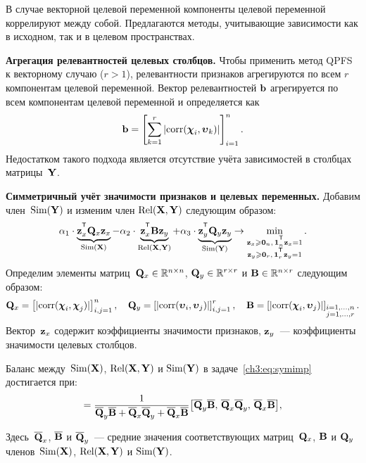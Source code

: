 \documentclass[11pt, a5paper]{dissert}
\begin{document}
В случае векторной целевой переменной компоненты целевой переменной коррелируют между собой. 
Предлагаются методы, учитывающие зависимости как в исходном, так и в целевом пространствах.

\textbf{Агрегация релевантностей целевых столбцов.}
Чтобы применить метод QPFS к векторному случаю ($r > 1$), релевантности признаков агрегируются по всем $r$ компонентам целевой переменной. 
Вектор релевантностей $\mathbf{b}$ агрегируется по всем компонентам целевой переменной и определяется как
\begin{equation*}
	\mathbf{b} = \left[\sum_{k=1}^r|\text{corr}(\boldsymbol{\chi}_i, \boldsymbol{\upsilon}_k)|\right]_{i=1}^n.
\end{equation*}
Недостатком такого подхода является отсутствие учёта зависимостей в столбцах матрицы~$\mathbf{Y}$. 

\textbf{Симметричный учёт значимости признаков и целевых переменных.}
Добавим член~$\text{Sim}(\mathbf{Y})$ и изменим член $\text{Rel}(\mathbf{X}, \mathbf{Y})$ следующим образом:
\begin{equation}
	\alpha_1 \cdot \underbrace{\bz_x^{\T} \bQ_x \bz_x}_{\text{Sim}(\bX)} - \alpha_2 \cdot \underbrace{\bz_x^{\T} \bB \bz_y}_{\text{Rel}(\bX, \bY)} + \alpha_3 \cdot \underbrace{\bz_y^{\T} \bQ_y \bz_y}_{\text{Sim}(\bY)} \rightarrow \min_{\substack{\bz_x \geq \bZero_n, \, \bOne_n^{\T}\bz_x=1 \\ \bz_y \geq \bZero_r, \, \bOne_r^{\T}\bz_y=1}}.
	\label{ch3:eq:symimp}
\end{equation}
Определим элементы матриц~$\mathbf{Q}_x \in \mathbb{R}^{n \times n}$, $\mathbf{Q}_y \in \mathbb{R}^{r \times r}$ и $\mathbf{B} \in \mathbb{R}^{n \times r}$ следующим образом:
\begin{equation*}
	\mathbf{Q}_x = \left[ |\text{corr}(\boldsymbol{\chi}_i, \boldsymbol{\chi}_j)| \right]_{i,j=1}^n, \quad
	\mathbf{Q}_y = \left[ |\text{corr}(\boldsymbol{\upsilon}_i, \boldsymbol{\upsilon}_j)| \right]_{i,j=1}^r, \quad
	\mathbf{B} =  \left[ |\text{corr}(\boldsymbol{\chi}_i, \boldsymbol{\upsilon}_j)| \right]_{\substack{i=1, \dots, n \\ j=1, \dots, r}}.
\end{equation*}
Вектор~$\mathbf{z}_x$ содержит коэффициенты значимости признаков, $\mathbf{z}_y$~--- коэффициенты значимости целевых столбцов.

\begin{statement}
	Баланс между~$\text{Sim}(\mathbf{X})$, $\text{Rel}(\mathbf{X}, \mathbf{Y})$ и $\text{Sim}(\mathbf{Y})$ в  задаче~\eqref{ch3:eq:symimp} достигается при:
	\begin{equation}
	[\alpha_1, \alpha_2, \alpha_3] = \frac{1}{\overline{\bQ}_y \overline{\bB} + \overline{\bQ}_x \overline{\bQ}_y + \overline{\bQ}_x \overline{\bB}}\bigl[\overline{\bQ}_y \overline{\bB}, \, \overline{\bQ}_x \overline{\bQ}_y, \, \overline{\bQ}_x \overline{\bB}\bigr], 
	\label{ch3:eq:alpha_3}
	\end{equation}
\end{statement}
Здесь~$\overline{\mathbf{Q}}_x$, $\overline{\mathbf{B}}$ и $\overline{\mathbf{Q}}_y$~--- средние значения соответствующих матриц~$\mathbf{Q}_x$, $\mathbf{B}$ и $\mathbf{Q}_y$ членов~$\text{Sim}(\mathbf{X})$, $\text{Rel}(\mathbf{X}, \mathbf{Y})$ и $\text{Sim}(\mathbf{Y})$.
\end{document}
